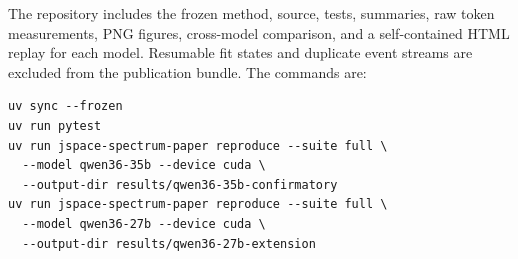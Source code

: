 \documentclass[10pt]{article}
\begin{document}
The repository includes the frozen method, source, tests, summaries, raw token
measurements, PNG figures, cross-model comparison, and a self-contained HTML
replay for each model. Resumable fit states and duplicate event streams are
excluded from the publication bundle. The commands are:
\begin{verbatim}
uv sync --frozen
uv run pytest
uv run jspace-spectrum-paper reproduce --suite full \
  --model qwen36-35b --device cuda \
  --output-dir results/qwen36-35b-confirmatory
uv run jspace-spectrum-paper reproduce --suite full \
  --model qwen36-27b --device cuda \
  --output-dir results/qwen36-27b-extension
\end{verbatim}



\end{document}
